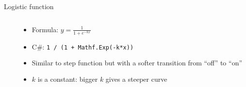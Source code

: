 \begin{frame}[fragile]{Logistic function}
    \begin{columns}
        \begin{column}{0.5\textwidth}
            \begin{center}
            \end{center}
        \end{column}
        \begin{column}{0.47\textwidth}
            \begin{itemize}
                \pause\item Formula: $y = \frac{1}{1+e^{-kx}}$
                \pause\item C\#: \lstinline{1 / (1 + Mathf.Exp(-k*x))}
                \pause\item Similar to step function but with a softer transition from ``off'' to ``on''
                \pause\item $k$ is a constant: bigger $k$ gives a steeper curve
            \end{itemize}
        \end{column}
    \end{columns}
\end{frame}


